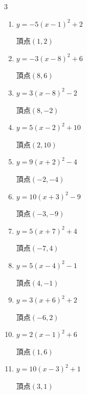 \begin{multicols}{3}
\begin{enumerate}
        $\displaystyle 頂点\left( -6 , 5 \right)$

  \item $\displaystyle y=-5\left( x-1\right)^{2}+2$

        $\displaystyle 頂点\left( 1 , 2 \right)$

  \item $\displaystyle y=-3\left( x-8\right)^{2}+6$

        $\displaystyle 頂点\left( 8 , 6 \right)$

  \item $\displaystyle y=3\left( x-8\right)^{2}-2$

        $\displaystyle 頂点\left( 8 , -2 \right)$

  \item $\displaystyle y=5\left( x-2\right)^{2}+10$

        $\displaystyle 頂点\left( 2 , 10 \right)$

  \item $\displaystyle y=9\left( x+2\right)^{2}-4$

        $\displaystyle 頂点\left( -2 , -4 \right)$

  \item $\displaystyle y=10\left( x+3\right)^{2}-9$

        $\displaystyle 頂点\left( -3 , -9 \right)$

  \item $\displaystyle y=5\left( x+7\right)^{2}+4$

        $\displaystyle 頂点\left( -7 , 4 \right)$

  \item $\displaystyle y=5\left( x-4\right)^{2}-1$

        $\displaystyle 頂点\left( 4 , -1 \right)$

  \item $\displaystyle y=3\left( x+6\right)^{2}+2$

        $\displaystyle 頂点\left( -6 , 2 \right)$

  \item $\displaystyle y=2\left( x-1\right)^{2}+6$

        $\displaystyle 頂点\left( 1 , 6 \right)$

\columnbreak %

\resetques

  \item $\displaystyle y=10\left( x-3\right)^{2}+1$

        $\displaystyle 頂点\left( 3 , 1 \right)$


\end{enumerate}
\end{multicols}
